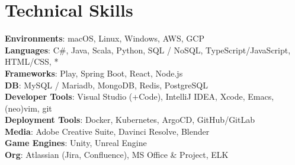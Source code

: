 \documentclass[letterpaper,11pt]{article}
\begin{document}
%
\section{Technical Skills}
\begin{itemize}[leftmargin=0.15in, label={}]
  \small{\item{
                \textbf{Environments}{: macOS, Linux, Windows, AWS, GCP } \\
                \textbf{Languages}{: C\#, Java, Scala, Python, SQL / NoSQL, TypeScript/JavaScript, HTML/CSS, * } \\
                \textbf{Frameworks}{: Play, Spring Boot, React, Node.js } \\
                \textbf{DB}{: MySQL / Mariadb, MongoDB, Redis, PostgreSQL } \\
                \textbf{Developer Tools}{: Visual Studio (+Code), IntelliJ IDEA, Xcode, Emacs, (neo)vim, git } \\
                \textbf{Deployment Tools}{: Docker, Kubernetes, ArgoCD, GitHub/GitLab } \\
                \textbf{Media}{: Adobe Creative Suite, Davinci Resolve, Blender} \\
                \textbf{Game Engines}{: Unity, Unreal Engine} \\
                \textbf{Org}{: Atlassian (Jira, Confluence), MS Office \& Project, ELK }
          }}
\end{itemize}


\end{document}
